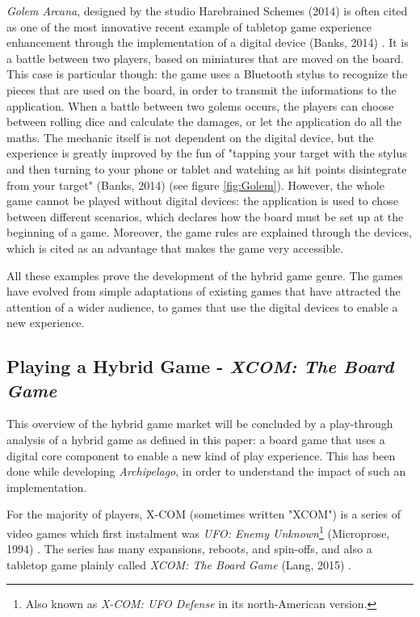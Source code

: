 \textit{Golem Arcana}, designed by the studio Harebrained Schemes (2014) \cite{game:golem} is often cited as one of the most innovative recent example of tabletop game experience enhancement through the implementation of a digital device (Banks, 2014) \cite{web:golem}. It is a battle between two players, based on miniatures that are moved on the board. This case is particular though: the game uses a Bluetooth stylus to recognize the pieces that are used on the board, in order to transmit the informations to the application. When a battle between two golems occurs, the players can choose between rolling dice and calculate the damages, or let the application do all the maths. The mechanic itself is not dependent on the digital device, but the experience is greatly improved by the fun of "tapping your target with the stylus and then turning to your phone or tablet and watching as hit points disintegrate from your target" (Banks, 2014) \cite{web:golem} (see figure \ref{fig:Golem}). However, the whole game cannot be played without digital devices: the application is used to chose between different scenarios, which declares how the board must be set up at the beginning of a game. Moreover, the game rules are explained through the devices, which is cited as an advantage that makes the game very accessible.

All these examples prove the development of the hybrid game genre. The games have evolved from simple adaptations of existing games that have attracted the attention of a wider audience, to games that use the digital devices to enable a new experience. 

\subsection{Playing a Hybrid Game - \textit{XCOM: The Board Game}}
\label{sec:xcom}
This overview of the hybrid game market will be concluded by a play-through analysis of a hybrid game as defined in this paper: a board game that uses a digital core component to enable a new kind of play experience. This has been done while developing \textit{Archipelago}, in order to understand the impact of such an implementation.

For the majority of players, X-COM (sometimes written "XCOM") is a series of video games which first instalment was \textit{UFO: Enemy Unknown}\footnote{Also known as \textit{X-COM: UFO Defense} in its north-American version.} (Microprose, 1994) \cite{game:xcom}. The series has many expansions, reboots, and spin-offs, and also a tabletop game plainly called \textit{XCOM: The Board Game} (Lang, 2015) \cite{game:xcomtbg}.

